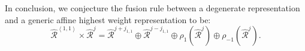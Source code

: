 \documentclass[10pt,a4paper]{article}
\numberwithin{equation}{section}
\newcommand{\vev}[1]{\left\langle #1 \right\rangle}
\begin{document}
In conclusion, we conjecture the fusion rule between a degenerate representation and a generic affine highest weight representation to be: 
\begin{equation}
    \boxed{
        \widehat{\mathcal{R}}^{\vev{1,1}} \times \widehat{\mathcal{R}}^{j} = \widehat{\mathcal{R}}^{j+j_{1,1}} \oplus \widehat{\mathcal{R}}^{j-j_{1,1}}
    \oplus \rho_{1} \left( \widehat{\mathcal{R}}^{j} \right) \oplus \rho_{-1} \left( \widehat{\mathcal{R}}^{j} \right).
    }
\end{equation}

\printbibliography
\end{document}
